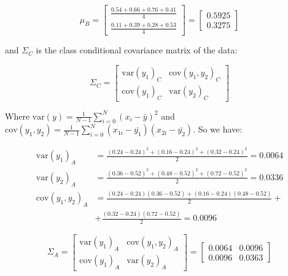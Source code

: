 \documentclass[12pt]{article}
\begin{document}
\begin{enumerate}[leftmargin=\labelsep]
\begin{enumerate}
        \begin{equation}
            \mu_B =
            \begin{bmatrix}
                \frac{0.54 + 0.66 + 0.76 + 0.41}{4} \\
                \frac{0.11 + 0.39 + 0.28 + 0.53}{4}
            \end{bmatrix} =
            \begin{bmatrix}
                0.5925 \\
                0.3275
            \end{bmatrix}
        \end{equation}

        and $\Sigma_C$ is the class conditional covariance matrix of the data:

        \begin{equation}
            \Sigma_C =
            \begin{bmatrix}
                \textrm{var}(y_1)_C & \textrm{cov}(y_1, y_2)_C \\
                \textrm{cov}(y_1)_C & \textrm{var}(y_2)_C
            \end{bmatrix} 
        \end{equation}

        Where $\textrm{var}(y) = \frac{1}{N-1}\sum_{i = 0}^{N}(x_i - \bar{y})^2$ and $\textrm{cov}(y_1, y_2) = \frac{1}{N-1}\sum_{i = 0}^{N}(x_{1i} - \bar{y_1})(x_{2i} - \bar{y_2})$.
        So we have:

        \begin{equation}
        \begin{split}
            \textrm{var}(y_1)_A &= \frac{(0.24-0.24)^2 + (0.16-0.24)^2 + (0.32-0.24)^2}{2} = 0.0064 \\
            \textrm{var}(y_2)_A &= \frac{(0.36-0.52)^2 + (0.48-0.52)^2 + (0.72-0.52)^2}{2} = 0.0336 \\
            \textrm{cov}(y_1, y_2)_A &= \frac{(0.24-0.24)(0.36-0.52) + (0.16-0.24)(0.48-0.52)}{2}+ \\
            &+ \frac{(0.32-0.24)(0.72-0.52)}{2} = 0.0096
        \end{split}
        \end{equation}

        \begin{equation}
            \Sigma_A =
            \begin{bmatrix}
                \textrm{var}(y_1)_A & \textrm{cov}(y_1, y_2)_A \\
                \textrm{cov}(y_1)_A & \textrm{var}(y_2)_A
            \end{bmatrix}=
            \begin{bmatrix}
                0.0064 & 0.0096 \\
                0.0096 & 0.0363
            \end{bmatrix}
        \end{equation}


\end{enumerate}
\end{enumerate}
\end{document}
